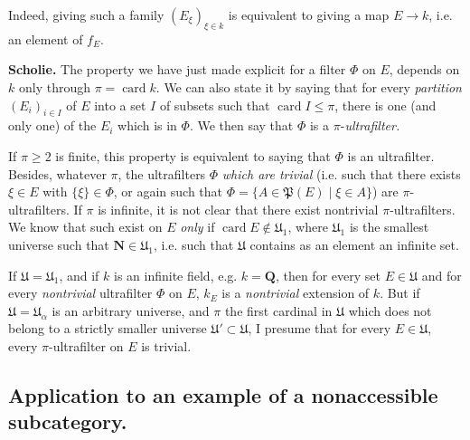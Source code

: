 \documentclass[11pt]{article}
\newcommand{\printedpage}[1]{\marginpar{\footnotesize p.~#1}}
\newcommand{\msp}[1]{\marginpar{\footnotesize [#1]}}
\begin{document}
\msp{page 10}
Indeed, giving such a family $(E_\xi)_{\xi\in k}$ is equivalent to giving a map $E\longrightarrow k$, i.e. an element of $f_E$. %

\textbf{Scholie.} The property we have just made explicit for a filter $\Phi$ on $E$, depends on $k$ only through $\pi=\operatorname{card}k$. We can also state it by saying that for every \textit{partition} $(E_i)_{i\in I}$ of $E$ into a set $I$ of subsets such that $\operatorname{card}I\leqslant\pi$, there is one (and only one) of the $E_i$ which is in $\Phi$. We then say that $\Phi$ is a $\pi$-\textit{ultrafilter.}

If $\pi\geqslant 2$ is finite, this property is equivalent to saying that $\Phi$ is an ultrafilter. Besides, whatever $\pi$, the ultrafilters $\Phi$ \textit{which are trivial} (i.e. such that there exists $\xi\in E$ with $\{\xi\}\in\Phi$, or again such that $\Phi=\{A\in\mathfrak{P}(E)\mid\xi\in A\}$) are $\pi$-ultrafilters. If $\pi$ is infinite, it is not clear that there exist nontrivial $\pi$-ultrafilters. We know that such exist on $E$ \textit{only} if $\operatorname{card}E\notin\mathfrak{U}_1$, where $\mathfrak{U}_1$ is the smallest universe such that $\mathbf{N}\in\mathfrak{U}_1$, i.e. such
\msp{page 11}
that $\mathfrak{U}$ contains as an element an infinite set.

If $\mathfrak{U}=\mathfrak{U}_1$, and if $k$ is an infinite field, e.g. $k=\mathbf{Q}$, then for every set $E\in\mathfrak{U}$ and for every \textit{nontrivial} ultrafilter $\Phi$ on $E$, $k_E$ is a \textit{nontrivial} extension of $k$. But if $\mathfrak{U}=\mathfrak{U}_\alpha$ is an arbitrary universe, and $\pi$ the first cardinal in $\mathfrak{U}$ which does not belong to a strictly smaller universe $\mathfrak{U}'\subset\mathfrak{U}$, I presume that for every $E\in\mathfrak{U}$, every $\pi$-ultrafilter on $E$ is trivial. %

\printedpage{196}

\subsection*{Application to an example of a nonaccessible subcategory.}
\end{document}
